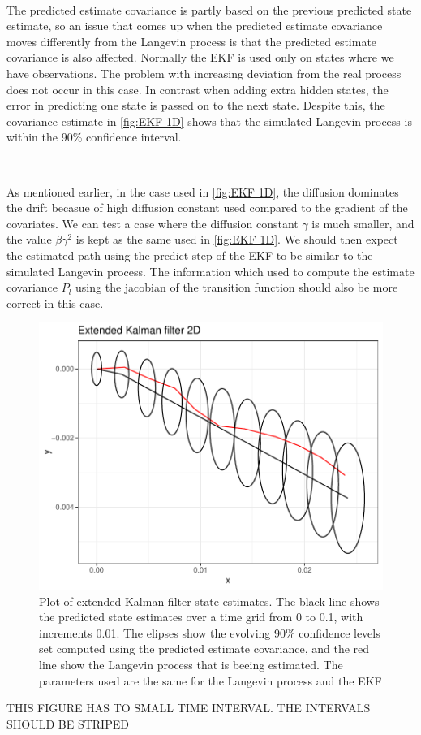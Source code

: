 \

The predicted estimate covariance is partly based on the previous predicted state estimate, so an issue that comes up when the predicted estimate covariance moves differently from the Langevin process is that the predicted estimate covariance is also affected. Normally the EKF is used only on states where we have observations. The problem with increasing deviation from the real process does not occur in this case. In contrast when adding extra hidden states, the error in predicting one state is passed on to the next state. Despite this, the covariance estimate in \ref{fig:EKF 1D} shows that the simulated Langevin process is within the 90\% confidence interval. 

\

As mentioned earlier, in the case used in \ref{fig:EKF 1D}, the diffusion dominates the drift becasue of high diffusion constant used compared to the gradient of the covariates. We can test a case where the diffusion constant $\gamma$ is much smaller, and the value $\beta \gamma^2$ is kept as the same used in \ref{fig:EKF 1D}. We should then expect the estimated path using the predict step of the EKF to be similar to the simulated Langevin process. The information which used to compute the estimate covariance $P_l$ using the jacobian of the transition function should also be more correct in this case.

\begin{figure}[H]
    \centering
    \includegraphics[width=\linewidth]{Images/ch3/EKF path 2D.pdf}
    \caption[Extended Kalman filter]{Plot of extended Kalman filter state estimates. The black line shows the predicted state estimates over a time grid from 0 to 0.1, with increments 0.01. The elipses show the evolving 90\% confidence levels set computed using the predicted estimate covariance, and the red line show the Langevin process that is beeing estimated. The parameters used are the same for the Langevin process and the EKF}
    \label{fig:EKF 2D}
\end{figure}
THIS FIGURE HAS TO SMALL TIME INTERVAL. THE INTERVALS SHOULD BE STRIPED

